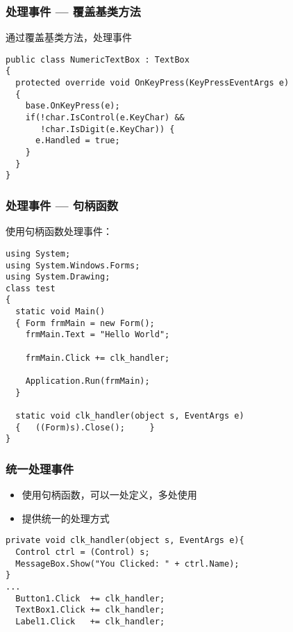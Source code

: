 \begin{frame}[fragile]
\frametitle{处理事件 --- 覆盖基类方法}
通过覆盖基类方法，处理事件
\begin{lstlisting}
public class NumericTextBox : TextBox
{
  protected override void OnKeyPress(KeyPressEventArgs e)
  {
    base.OnKeyPress(e);
    if(!char.IsControl(e.KeyChar) && 
       !char.IsDigit(e.KeyChar)) {
      e.Handled = true;
    }
  }
}
\end{lstlisting}
\end{frame}

\begin{frame}[fragile]
\frametitle{处理事件 --- 句柄函数}
使用句柄函数处理事件：
\begin{lstlisting}
using System;
using System.Windows.Forms;
using System.Drawing;
class test
{ 
  static void Main()
  { Form frmMain = new Form();
    frmMain.Text = "Hello World";

    frmMain.Click += clk_handler;

    Application.Run(frmMain);
  }

  static void clk_handler(object s, EventArgs e)
  {   ((Form)s).Close();     }
}
\end{lstlisting}
\end{frame}

\begin{frame}[fragile]
\frametitle{统一处理事件}
\begin{itemize}
\item 使用句柄函数，可以一处定义，多处使用
\item 提供统一的处理方式
\end{itemize}
\begin{lstlisting}
private void clk_handler(object s, EventArgs e){
  Control ctrl = (Control) s;
  MessageBox.Show("You Clicked: " + ctrl.Name);
}
...
  Button1.Click  += clk_handler;
  TextBox1.Click += clk_handler;
  Label1.Click   += clk_handler;
\end{lstlisting}
\end{frame}



